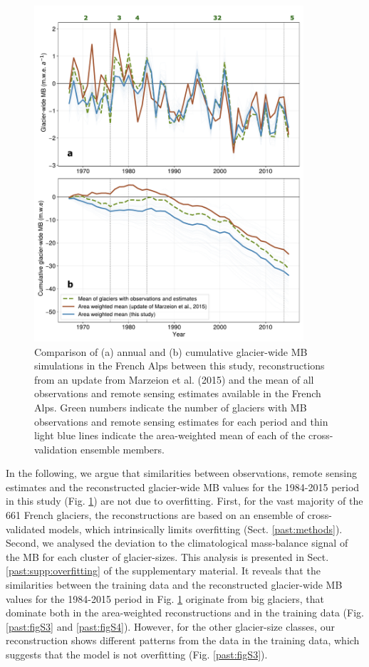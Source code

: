 {\begin{figure}[t]
\centering
\includegraphics[width=10cm]{Figures/past/Figure_6.pdf}
\captionsetup{justification=centering}
\caption{Comparison of (a) annual and (b) cumulative glacier-wide MB simulations in the French Alps between this study, reconstructions from an update from Marzeion et al. (2015) and the mean of all observations and remote sensing estimates available in the French Alps. Green numbers indicate the number of glaciers with MB observations and remote sensing estimates for each period and thin light blue lines indicate the area-weighted mean of each of the cross-validation ensemble members.}
\label{past:fig6}
\end{figure}

In the following, we argue that similarities between observations, remote sensing estimates and the reconstructed glacier-wide MB values for the 1984-2015 period in this study (Fig. \ref{past:fig6}) are not due to overfitting. First, for the vast majority of the 661 French glaciers, the reconstructions are based on an ensemble of cross-validated models, which intrinsically limits overfitting (Sect. \ref{past:methods}).  Second, we analysed the deviation to the climatological mass-balance signal of the MB for each cluster of glacier-sizes. This analysis is presented in Sect. \ref{past:supp:overfitting} of the supplementary material. It reveals that the similarities between the training data and the reconstructed glacier-wide MB values for the 1984-2015 period in Fig. \ref{past:fig6} originate from big glaciers, that dominate both in the area-weighted reconstructions and in the training data (Fig. \ref{past:figS3} and \ref{past:figS4}). However, for the other glacier-size classes, our reconstruction shows different patterns from the data in the training data, which suggests that the model is not overfitting (Fig. \ref{past:figS3}). 

}
